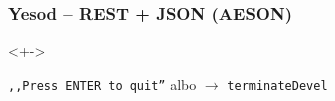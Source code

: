 \documentclass[landscape]{beamer}
\begin{document}
\begin{frame}
  \frametitle{Yesod -- REST + JSON (AESON)}
  
  \begin{uncoverenv}<+->
    \begin{center}
      \texttt{,,Press ENTER to quit''}
      albo
      {}
      $\rightarrow$ \texttt{terminateDevel}
    \end{center}
  \end{uncoverenv}

  \uncover<+->{}
\end{frame}
\end{document}
